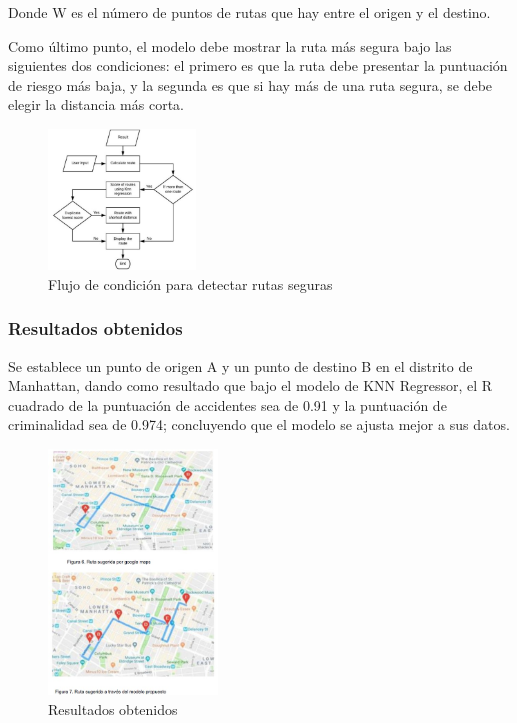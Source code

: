 Donde W es el número de puntos de rutas que hay entre el origen y el destino.

Como último punto, el modelo debe mostrar la ruta más segura bajo las siguientes dos condiciones: el primero es que la ruta debe presentar la puntuación de riesgo más baja, y la segunda es que si hay más de una ruta segura, se debe elegir la distancia más corta.
\begin{figure}[h]
	\begin{center}
		\includegraphics[width=0.35\textwidth]{2/figures/CondicionSafe.jpg}
		\caption{Flujo de condición para detectar rutas seguras}
		\label{1:fig2}
	\end{center}
\end{figure}

\subsubsection{Resultados obtenidos}
Se establece un punto de origen A y un punto de destino B en el distrito de Manhattan, dando como resultado que bajo el modelo de KNN Regressor, el R cuadrado de la puntuación de accidentes sea de 0.91 y la puntuación de criminalidad sea de 0.974; concluyendo que el modelo se ajusta mejor a sus datos.

\begin{figure}[h]
	\begin{center}
		\includegraphics[width=0.4\textwidth]{2/figures/resultRoute.jpg}
		\caption{Resultados obtenidos}
		\label{1:fig2}
	\end{center}
\end{figure}

